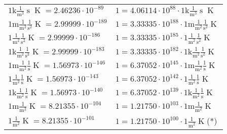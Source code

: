 \begin{center}
\begin{longtable}{l l}
{\color{gray}$1 \bm{\mathrm{ k}}\frac1{\operatorname{m}^3}{\operatorname{s}}{}{\operatorname{K}} = 2.46236\cdot10^{-89} $}   & {\color{gray}$ 1 = 4.06114\cdot10^{88} \cdot 1 \bm{\mathrm{ k}}\frac1{\operatorname{m}^3}{\operatorname{s}}{}{\operatorname{K}}$}  \\
{\color{gray}$1 \bm{\mathrm{ m}}\frac1{\operatorname{m}^2}\frac1{\operatorname{s}^2}{}{\operatorname{K}} = 2.99999\cdot10^{-189} $}   & {\color{gray}$ 1 = 3.33335\cdot10^{188} \cdot 1 \bm{\mathrm{ m}}\frac1{\operatorname{m}^2}\frac1{\operatorname{s}^2}{}{\operatorname{K}}$}  \\
{\color{black}$1 \bm{\mathrm{ }}\frac1{\operatorname{m}^2}\frac1{\operatorname{s}^2}{}{\operatorname{K}} = 2.99999\cdot10^{-186} $}   & {\color{black}$ 1 = 3.33335\cdot10^{185} \cdot 1 \bm{\mathrm{ }}\frac1{\operatorname{m}^2}\frac1{\operatorname{s}^2}{}{\operatorname{K}}$}  \\
{\color{gray}$1 \bm{\mathrm{ k}}\frac1{\operatorname{m}^2}\frac1{\operatorname{s}^2}{}{\operatorname{K}} = 2.99999\cdot10^{-183} $}   & {\color{gray}$ 1 = 3.33335\cdot10^{182} \cdot 1 \bm{\mathrm{ k}}\frac1{\operatorname{m}^2}\frac1{\operatorname{s}^2}{}{\operatorname{K}}$}  \\
{\color{gray}$1 \bm{\mathrm{ m}}\frac1{\operatorname{m}^2}\frac1{\operatorname{s}}{}{\operatorname{K}} = 1.56973\cdot10^{-146} $}   & {\color{gray}$ 1 = 6.37052\cdot10^{145} \cdot 1 \bm{\mathrm{ m}}\frac1{\operatorname{m}^2}\frac1{\operatorname{s}}{}{\operatorname{K}}$}  \\
{\color{black}$1 \bm{\mathrm{ }}\frac1{\operatorname{m}^2}\frac1{\operatorname{s}}{}{\operatorname{K}} = 1.56973\cdot10^{-143} $}   & {\color{black}$ 1 = 6.37052\cdot10^{142} \cdot 1 \bm{\mathrm{ }}\frac1{\operatorname{m}^2}\frac1{\operatorname{s}}{}{\operatorname{K}}$}  \\
{\color{gray}$1 \bm{\mathrm{ k}}\frac1{\operatorname{m}^2}\frac1{\operatorname{s}}{}{\operatorname{K}} = 1.56973\cdot10^{-140} $}   & {\color{gray}$ 1 = 6.37052\cdot10^{139} \cdot 1 \bm{\mathrm{ k}}\frac1{\operatorname{m}^2}\frac1{\operatorname{s}}{}{\operatorname{K}}$}  \\
{\color{gray}$1 \bm{\mathrm{ m}}\frac1{\operatorname{m}^2}{}{}{\operatorname{K}} = 8.21355\cdot10^{-104} $}   & {\color{gray}$ 1 = 1.21750\cdot10^{103} \cdot 1 \bm{\mathrm{ m}}\frac1{\operatorname{m}^2}{}{}{\operatorname{K}}$}  \\
{\color{black}$1 \bm{\mathrm{ }}\frac1{\operatorname{m}^2}{}{}{\operatorname{K}} = 8.21355\cdot10^{-101} $}   & {\color{black}$ 1 = 1.21750\cdot10^{100} \cdot 1 \bm{\mathrm{ }}\frac1{\operatorname{m}^2}{}{}{\operatorname{K}}$}\quad(*)\\

\end{longtable}
\end{center}
